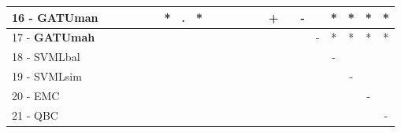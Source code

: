 \begin{table}[h]
\begin{center}
\begin{tabular}{lcc|cc|cc|cc|cc|cc|cc|cc|cc|cc|c}
16 - \textbf{GATUman}	&   &   &   &   &   & * & . & * &   &   &   &   &   & + &   & - &   & * & * & * & * \\ \hline
17 - \textbf{GATUmah}	&   &   &   &   &   &   &   &   &   &   &   &   &   &   &   &   & - & * & * & * & * \\
18 - SVMLbal	&   &   &   &   &   &   &   &   &   &   &   &   &   &   &   &   &   & - &   &   &   \\ \hline
19 - SVMLsim	&   &   &   &   &   &   &   &   &   &   &   &   &   &   &   &   &   &   & - &   &   \\
20 - EMC  	&   &   &   &   &   &   &   &   &   &   &   &   &   &   &   &   &   &   &   & - &   \\ \hline
21 - QBC  	&   &   &   &   &   &   &   &   &   &   &   &   &   &   &   &   &   &   &   &   & - \\\end{tabular}
\label{stratsALCKappaFriedVFDTRedux}
\end{center}
\end{table}